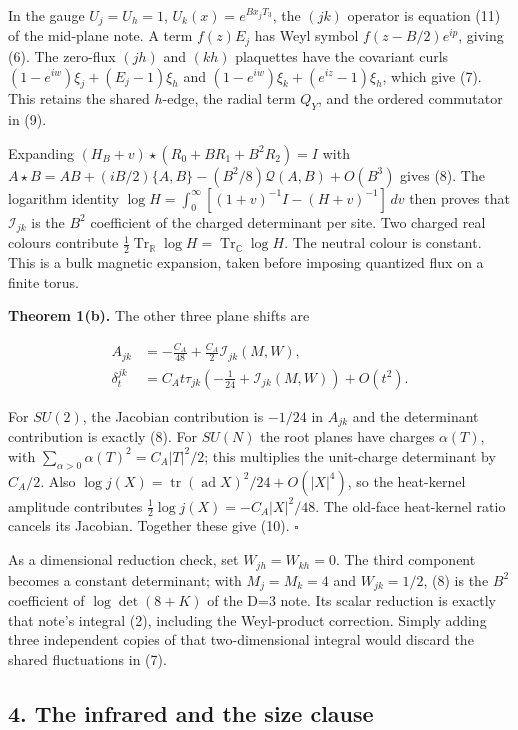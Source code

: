 \documentclass[11pt,a4paper]{article}
\begin{document}
In the gauge \(U_j=U_h=1\), \(U_k(x)=e^{Bx_jT_3}\), the \((jk)\)
operator is equation (11) of the mid-plane note. A term \(f(z)E_j\) has
Weyl symbol \(f(z-B/2)e^{ip}\), giving (6). The zero-flux \((jh)\) and
\((kh)\) plaquettes have the covariant curls
\((1-e^{iw})\xi_j+(E_j-1)\xi_h\) and
\((1-e^{iw})\xi_k+(e^{iz}-1)\xi_h\), which give (7). This retains the
shared \(h\)-edge, the radial term \(Q_Y\), and the ordered commutator
in (9).

Expanding \((H_B+v)\star(R_0+BR_1+B^2R_2)=I\) with
\(A\star B=AB+(iB/2)\{A,B\}-(B^2/8)\mathcal Q(A,B)+O(B^3)\) gives (8).
The logarithm identity
\(\log H=\int_0^\infty[(1+v)^{-1}I-(H+v)^{-1}]\,dv\) then proves that
\(\mathcal I_{jk}\) is the \(B^2\) coefficient of the charged
determinant per site. Two charged real colours contribute
\(\tfrac12\operatorname{Tr}_{\mathbb R}\log H =\operatorname{Tr}_{\mathbb C}\log H\).
The neutral colour is constant. This is a bulk magnetic expansion, taken
before imposing quantized flux on a finite torus.

\textbf{Theorem 1(b).} The other three plane shifts are

\[\boxed{\begin{aligned}
 A_{jk}&=-\frac{C_A}{48}+\frac{C_A}{2}\mathcal I_{jk}(M,W),\\
 \delta_t^{jk}&=C_A t\tau_{jk}
 \left(-\frac1{24}+\mathcal I_{jk}(M,W)\right)+O(t^2).
\end{aligned}}\tag{10}\]

For \(SU(2)\), the Jacobian contribution is \(-1/24\) in \(A_{jk}\) and
the determinant contribution is exactly (8). For \(SU(N)\) the root
planes have charges \(\alpha(T)\), with
\(\sum_{\alpha>0}\alpha(T)^2=C_A|T|^2/2\); this multiplies the
unit-charge determinant by \(C_A/2\). Also
\(\log j(X)=\operatorname{tr}(\operatorname{ad}X)^2/24+O(|X|^4)\), so
the heat-kernel amplitude contributes
\(\tfrac12\log j(X) =-C_A|X|^2/48\). The old-face heat-kernel ratio
cancels its Jacobian. Together these give (10). \(\square\)

As a dimensional reduction check, set \(W_{jh}=W_{kh}=0\). The third
component becomes a constant determinant; with \(M_j=M_k=4\) and
\(W_{jk}=1/2\), (8) is the \(B^2\) coefficient of \(\log\det(8+K)\) of
the D=3 note. Its scalar reduction is exactly that note's integral (2),
including the Weyl-product correction. Simply adding three independent
copies of that two-dimensional integral would discard the shared
fluctuations in (7).

\hypertarget{the-infrared-and-the-size-clause}{%
\subsection{4. The infrared and the size
clause}\label{the-infrared-and-the-size-clause}}
\end{document}
